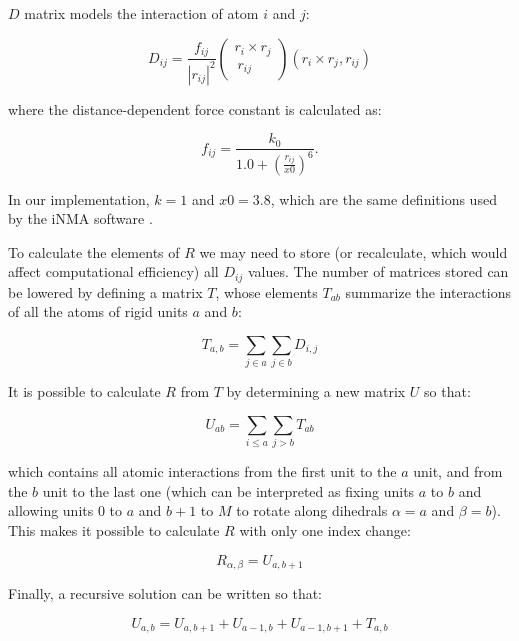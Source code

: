 $D$ matrix models the interaction of atom $i$ and $j$:

\begin{equation}
D_{ij} = \frac{f_{ij}}{ \left| r_{ij} \right|^2} \left( \begin{array}{cc} r_i \times r_j \\\ r_{ij} \end{array} \right) \left( r_i \times r_j , r_{ij} \right)
\end{equation}

where the distance-dependent force constant is calculated as:

\begin{equation}
f_{ij} = \frac{k_0} { 1.0 + \left( \frac{r_{ij}}{x0} \right) ^6}.
\end{equation}

In our implementation, $k = 1$ and  $x0 = 3.8$, which are the same definitions used by the iNMA software \cite{lopez-blanco_imod_2011}.

To calculate the elements of $R$ we may need to store (or recalculate, which would affect computational efficiency) all $D_{ij}$ values. The number of matrices stored can be lowered by defining a matrix $T$, whose elements $T_{ab}$ summarize the interactions of all the atoms of rigid units $a$ and $b$:

\begin{equation}
T_{a,b} = \sum_{j \in a} \sum_{j \in b} D_{i,j}
\end{equation}

It is possible to calculate $R$ from $T$ by determining a new matrix $U$ so that:

\begin{equation}
U_{ab} = \sum_{i \leq a} \sum_{j >b} T_{ab}
\end{equation}

which contains all atomic interactions from the first unit to the $a$ unit, and from the $b$ unit to the last one (which can be interpreted as fixing units $a$ to $b$ and allowing units 0 to $a$ and $b+1$ to $M$ to rotate along dihedrals $\alpha = a$ and $\beta = b$). This makes it possible to calculate $R$ with only one index change: 

\begin{equation}
R_{\alpha,\beta} = U_{a,b+1}
\end{equation}

Finally, a recursive solution can be written so that:

\begin{equation}
U_{a,b} = U_{a,b+1}+U_{a-1,b} + U_{a-1,b+1}+T_{a,b}
\end{equation}

